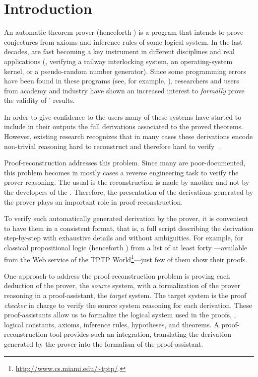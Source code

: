 \documentclass[../main.tex]{subfiles}
\begin{document}

\section{Introduction}
\label{sec:introduction}

An automatic theorem prover (henceforth \ATP) is a program that
intends to prove conjectures from axioms and inference rules of some
logical system. In the last decades, \ATPs are fast becoming a key
instrument in different disciplines and real applications (\eg,
verifying a railway interlocking system, an operating-system kernel,
or a pseudo-random number generator). Since some
programming errors have been found in these programs (see, for
example, \cite{Keller2013,Bohme2011,Fleury2014}), researchers and
users from academy and industry have shown an increased interest to
\emph{formally} prove the validity of \ATPs' results.

In order to give confidence to the \ATP users many of these systems
have started to include in their outputs the full derivations
associated to the proved theorems. However, existing research
recognizes that in many cases these derivations encode non-trivial
reasoning hard to reconstruct and therefore hard to
verify~\cite{paulson2007source,Keller2013}.

Proof-reconstruction addresses this problem. Since many \ATPs are
poor-documented, this problem becomes in mostly cases a reverse
engineering task to verify the prover reasoning. The usual is the
reconstruction is made by another and not by the developers of the
\ATP. Therefore, the presentation of the derivations generated by the
prover plays an important role in proof-reconstruction.

To verify such automatically generated derivation by the prover,
it is convenient to have them in a
consistent format, that is, a full script describing the derivation
step-by-step with  exhaustive details and without ambiguities. For
example, for classical propositional logic (henceforth \CPL) from a
list of at least forty \ATPs---available from the Web service
 of the TPTP World\footnote{\url{http://www.cs.miami.edu/~tptp/}.}---just few of
them show their proofs.

One approach to address the proof-reconstruction problem is
proving each deduction of the prover, the \emph{source} system,
with a formalization of the prover reasoning in a proof-assistant, the
\emph{target} system. The target system is the
proof \emph{checker} in charge to verify the source system reasoning
for each derivation.
These proof-assistants allow us to formalize the logical system used
in the proofs, \ie, logical constants, axioms, inference rules,
hypotheses, and theorems.
A proof-reconstruction tool provides such an
integration, translating the derivation generated by the prover into
the formalism of the proof-assistant.
\end{document}
